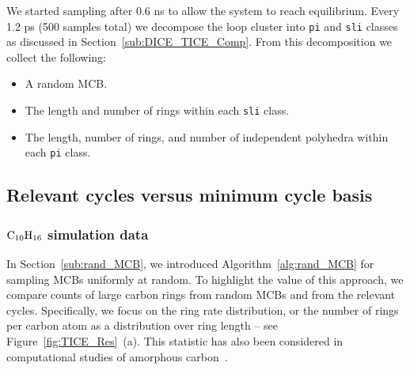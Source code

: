 \documentclass[fleqn,11pt]{article}
\begin{document}
We started sampling after 0.6 ns to allow the system to reach equilibrium. 
Every 1.2 ps (500 samples total) we decompose the loop cluster into {\tt pi} and {\tt sli} classes as discussed in Section~\ref{sub:DICE_TICE_Comp}. 
From this decomposition we collect the following:
\begin{itemize}
	\item A random MCB.
	\item The length and number of rings within each {\tt sli} class.
	\item The length, number of rings, and number of independent polyhedra within each {\tt pi} class.
\end{itemize}

%
%

\subsection{Relevant cycles versus minimum cycle basis} 
\subsubsection{$\rm C_{10}H_{16}$ simulation data}
In Section~\ref{sub:rand_MCB}, we introduced Algorithm~\ref{alg:rand_MCB} for sampling MCBs uniformly at random. 
To highlight the value of this approach, we compare counts of large carbon rings from random MCBs and from the relevant cycles.
Specifically, we focus on the ring rate distribution, or the number of rings per carbon atom as a distribution over ring length -- see Figure~\ref{fig:TICE_Res}~(a).
This statistic has also been considered in computational studies of amorphous carbon~\cite{dernovMapping2025,deringerMachine2017}. 
\end{document}
